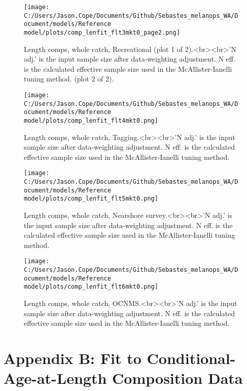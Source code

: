 \documentclass[11pt,
  letterpaper,
]{article}
\begin{document}
\begin{figure}
{\centering
\texttt{[image: C:/Users/Jason.Cope/Documents/Github/Sebastes\_melanops\_WA/Document/models/Reference model/plots/comp\_lenfit\_flt3mkt0\_page2.png]}
}
\caption{Length comps, whole catch, Recreational (plot 1 of 2).<br><br>'N adj.' is the input sample size after data-weighting adjustment. N eff. is the calculated effective sample size used in the McAllister-Ianelli tuning method. (plot 2 of 2).\label{fig:comp_lenfit_flt3mkt0_page2}}
\end{figure}

\begin{figure}
{\centering
\texttt{[image: C:/Users/Jason.Cope/Documents/Github/Sebastes\_melanops\_WA/Document/models/Reference model/plots/comp\_lenfit\_flt4mkt0.png]}
}
\caption{Length comps, whole catch, Tagging.<br><br>'N adj.' is the input sample size after data-weighting adjustment. N eff. is the calculated effective sample size used in the McAllister-Ianelli tuning method.\label{fig:comp_lenfit_flt4mkt0}}
\end{figure}

\begin{figure}
{\centering
\texttt{[image: C:/Users/Jason.Cope/Documents/Github/Sebastes\_melanops\_WA/Document/models/Reference model/plots/comp\_lenfit\_flt5mkt0.png]}
}
\caption{Length comps, whole catch, Nearshore survey.<br><br>'N adj.' is the input sample size after data-weighting adjustment. N eff. is the calculated effective sample size used in the McAllister-Ianelli tuning method.\label{fig:comp_lenfit_flt5mkt0}}
\end{figure}

\begin{figure}
{\centering
\texttt{[image: C:/Users/Jason.Cope/Documents/Github/Sebastes\_melanops\_WA/Document/models/Reference model/plots/comp\_lenfit\_flt6mkt0.png]}
}
\caption{Length comps, whole catch, OCNMS.<br><br>'N adj.' is the input sample size after data-weighting adjustment. N eff. is the calculated effective sample size used in the McAllister-Ianelli tuning method.\label{fig:comp_lenfit_flt6mkt0}}
\end{figure}

\clearpage

\hypertarget{app-b}{%
\section{Appendix B: Fit to Conditional-Age-at-Length Composition Data}\label{app-b}}
\end{document}
